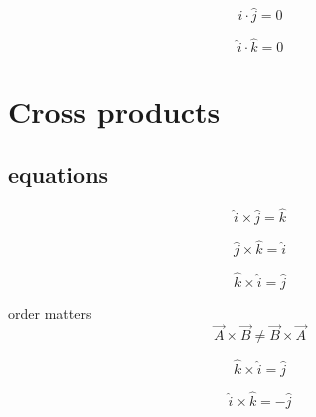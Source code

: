 \documentclass[a4paper]{article}
\begin{document}
        \begin{equation}
            \hat{i} \cdot \hat{j} = 0
        \end{equation}

        \begin{equation}
            \hat{i} \cdot \hat{k} = 0
        \end{equation}

    \section{Cross products}
    \subsection{equations}
        \begin{equation}
            \hat{i} \times \hat{j} = \hat{k}
        \end{equation}

        \begin{equation}
            \hat{j} \times \hat{k} = \hat{i}
        \end{equation}

        \begin{equation}
            \hat{k} \times \hat{i} = \hat{j}
        \end{equation}

        order matters
        \begin{equation}
            \vec{A} \times \vec{B} \neq \vec{B} \times \vec{A}
        \end{equation}

        \begin{equation}
            \hat{k} \times \hat{i} = \hat{j} 
        \end{equation}

        \begin{equation}
            \hat{i} \times \hat{k} = -\hat{j}
        \end{equation}
\end{document}
